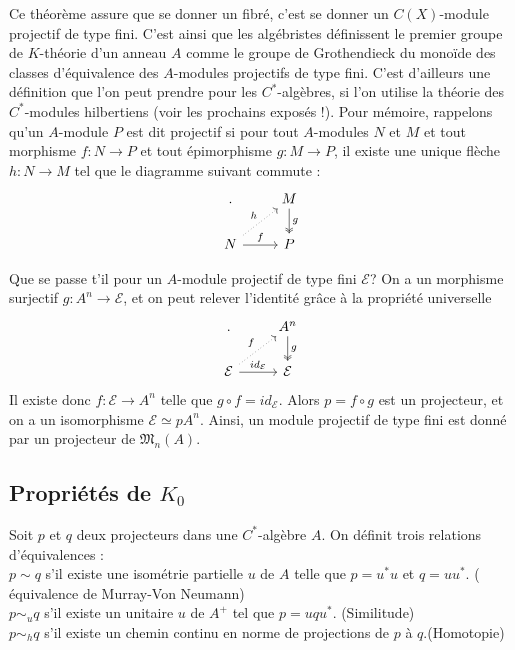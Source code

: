 Ce théorème assure que se donner un fibré, c'est se donner un $C(X)$-module projectif de type fini. C'est ainsi que les algébristes définissent le premier groupe de $K$-théorie d'un anneau $A$ comme le groupe de Grothendieck du monoïde des classes d'équivalence des $A$-modules projectifs de type fini. C'est d'ailleurs une définition que l'on peut prendre pour les $C^*$-algèbres, si l'on utilise la théorie des $C^*$-modules hilbertiens (voir les prochains exposés !). Pour mémoire, rappelons qu'un $A$-module $P$ est dit projectif si pour tout $A$-modules $N$ et $M$ et tout morphisme $f : N\rightarrow P$ et tout épimorphisme $g: M\rightarrow P$, il existe une unique flèche $h : N\rightarrow M$ tel que le diagramme suivant commute :
\[\begin{tikzcd}  . & M \arrow[two heads]{d}{g} \\
	N \arrow[dotted]{ur}{h}\arrow{r}{f} & P
\end{tikzcd}\]

Que se passe t'il pour un $A$-module projectif de type fini $\mathcal E $? On a un morphisme surjectif $g : A^n \rightarrow \mathcal E$, et on peut relever l'identité grâce à la propriété universelle
\[\begin{tikzcd}
 . 		& A^n \arrow[two heads]{d}{g} \\
	\mathcal E \arrow[dotted]{ur}{f}\arrow{r}{id_{\mathcal E}} & \mathcal E
\end{tikzcd}\]
Il existe donc $f : \mathcal E \rightarrow A^n$ telle que $g\circ f = id_{\mathcal E}$. Alors $p = f\circ g$ est un projecteur, et on a un isomorphisme $ \mathcal E \simeq pA^n$. Ainsi, un module projectif de type fini est donné par un projecteur de $\mathfrak M_n (A)$.

\subsection{Propriétés de $K_0$}

\begin{definition}
Soit $p$ et $q$ deux projecteurs dans une $C^*$-algèbre $A$. On définit trois relations d'équivalences :\\
$p\sim q$ s'il existe une isométrie partielle $u$ de $A$ telle que $p=u^*u $ et $q=uu^*$. ( équivalence de Murray-Von Neumann)\\
$p\sim_u q$ s'il existe un unitaire $u$ de $A^+$ tel que $p=uqu^*$. (Similitude)\\
$p\sim_h q$ s'il existe un chemin continu en norme de projections de $p$ à $q$.(Homotopie)\\
\end{definition}

